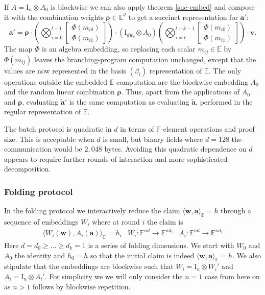 \documentclass[11pt,letterpaper,usenames,dvipsnames]{article}
\begin{document}
If $A = \mathrm{I}_n \otimes A_0$ is blockwise we can also apply theorem \ref{suc-embed} and compose it with the combination weights $\boldsymbol{\rho} \in \mathbb{E}^d$ to get a succinct representation for $\mathbf{a}'$:
\begin{equation}
\mathbf{a}' = 
\boldsymbol{\rho} \cdot
\left(
\bigotimes_{i=0}^{l-1} 
\begin{bmatrix}
\Phi (m_{i0}) \\ \Phi (m_{i1})
\end{bmatrix}
\right) \cdot
(\mathrm{I}_{d w_l} \otimes A_0)\left(
\bigotimes_{i=l}^{l+k-1} 
\begin{bmatrix}
\Phi (m_{i0}) \\ \Phi(m_{i1})
\end{bmatrix}
\right) \cdot \mathbf{v}
\text{.}
\end{equation}
The map $\Phi$ is an algebra embedding, so replacing each scalar $m_{ij}\in\mathbb E$ by $\Phi(m_{ij})$ leaves the branching-program computation unchanged, except that the values are now represented in the basis $(\beta_i)$ representation of $\mathbb E$. The only operations outside the embedded $\mathbb{E}$ computation are the blockwise embedding $A_0$ and the random linear combination $\boldsymbol{\rho}$. Thus, apart from the applications of $A_0$ and $\boldsymbol{\rho}$, evaluating $\widetilde{\mathbf a}'$ is the same computation as evaluating $\widetilde{\mathbf a}$, performed in the regular representation of $\mathbb E$. 

The batch protocol is quadratic in $d$ in terms of $\mathbb{F}$-element operations and proof size. This is acceptable when $d$ is small, but binary fields where $d = 128$ the communication would be $2,048$ bytes. Avoiding this quadratic dependence on $d$ appears to require further rounds of interaction and more sophisticated decomposition.

\subsubsection{Folding protocol}
In the folding protocol we interactively reduce the claim $\langle \mathbf{w}, \mathbf{a}\rangle_\mathbb{E} = h$ through a sequence of embeddings $W_i$ where at round $i$ the claim is
\[
\begin{array}{ccc}
\langle W_i(\mathbf{w}), A_i(\mathbf{a})\rangle_\mathbb{E} = h_i
& W_i: \mathbb{F}^{nd} \to \mathbb{E}^{nd_i}
& A_i: \mathbb{E}^{nd} \to \mathbb{E}^{nd_i}
\end{array}
\]
Here $d = d_0 \ge \dots \ge d_k = 1$ is a series of folding dimensions. We start with $W_0$ and $A_0$ the identity and $h_0 = h$ so that the initial claim is indeed $\langle \mathbf{w}, \mathbf{a} \rangle_\mathbb{E} = h$. We also stipulate that the embeddings are blockwise such that $W_i = \mathrm{I}_n \otimes W_i'$ and $A_i = \mathrm{I}_n \otimes A_i'$. For simplicity we we will only consider the $n=1$ case from here on as $n>1$ follows by blockwise repetition.
\end{document}

